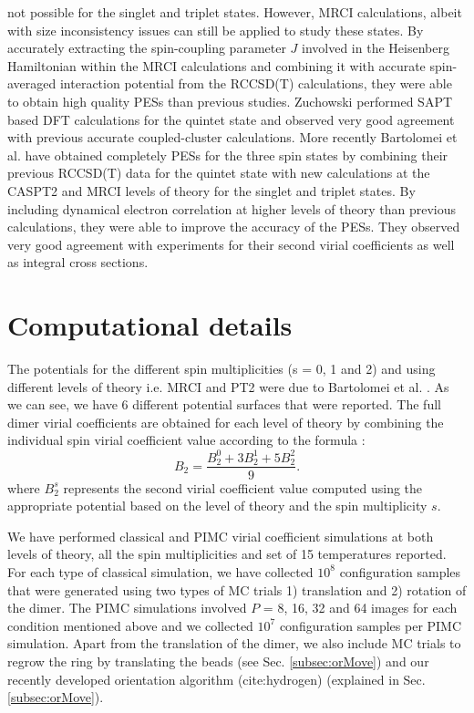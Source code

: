 not possible for the singlet and triplet states. However, MRCI calculations, albeit with size inconsistency issues can still be applied to study these states. By accurately extracting the spin-coupling parameter $J$ involved in the Heisenberg Hamiltonian within the MRCI calculations and combining it with accurate spin-averaged interaction potential from the RCCSD(T) calculations, they were able to obtain high quality PESs than previous studies. Zuchowski \cite{Zuchowski2008} performed SAPT based DFT calculations for the quintet state and observed very good agreement with previous accurate \abinitio{} coupled-cluster calculations. More recently Bartolomei et al. \cite{Bartolomei2010} have obtained completely \abinitio{} PESs for the three spin states by combining their previous RCCSD(T) data \cite{Bartolomei2008} for the quintet state with new \abinitio{} calculations at the CASPT2 and MRCI levels of theory for the singlet and triplet states. By including dynamical electron correlation at higher levels of theory than previous calculations, they were able to improve the accuracy of the PESs. They observed very good agreement with experiments for their second virial coefficients as well as integral cross sections.
\section{Computational details}
    The \abinitio{} potentials for the different spin multiplicities (s = 0, 1 and 2) and using different levels of theory i.e. MRCI and PT2 were due to Bartolomei et al. \cite{Bartolomei2010}. As we can see, we have 6 different potential surfaces that were reported. The full dimer virial coefficients are obtained for each level of theory by combining the individual spin virial coefficient value according to the formula \cite{Aquilanti1999,Bartolomei2010}:
    \begin{equation}
        B_2 = \frac{B_2^0 + 3 B_2^1 + 5 B_2^2}{9}.
    \end{equation}
    where $B_2^s$ represents the second virial coefficient value computed using the appropriate potential based on the level of theory and the spin multiplicity $s$.

    We have performed classical and PIMC virial coefficient simulations at both levels of theory, all the spin multiplicities and set of 15 temperatures reported. For each type of classical simulation, we have collected $10^8$ configuration samples that were generated using two types of MC trials 1) translation and 2) rotation of the dimer. The PIMC simulations involved $P$ = 8, 16, 32 and 64 images for each condition mentioned above and we collected $10^7$ configuration samples per PIMC simulation. Apart from the translation of the dimer, we also include MC trials to regrow the ring by translating the beads (see Sec. \ref{subsec:orMove}) and our recently developed orientation algorithm (cite:hydrogen) (explained in Sec. \ref{subsec:orMove}).

